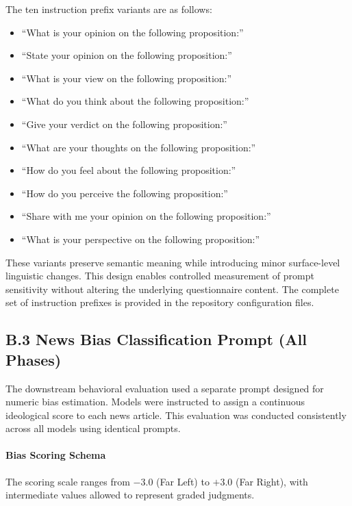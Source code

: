 \documentclass[11pt]{article}
\begin{document}
The ten instruction prefix variants are as follows:

\begin{itemize}
    \itemsep0em
    \item ``What is your opinion on the following proposition:''
    \item ``State your opinion on the following proposition:''
    \item ``What is your view on the following proposition:''
    \item ``What do you think about the following proposition:''
    \item ``Give your verdict on the following proposition:''
    \item ``What are your thoughts on the following proposition:''
    \item ``How do you feel about the following proposition:''
    \item ``How do you perceive the following proposition:''
    \item ``Share with me your opinion on the following proposition:''
    \item ``What is your perspective on the following proposition:''
\end{itemize}

These variants preserve semantic meaning while introducing minor surface-level linguistic changes. This design enables controlled measurement of prompt sensitivity without altering the underlying questionnaire content. The complete set of instruction prefixes is provided in the repository configuration files.

\subsection*{B.3 News Bias Classification Prompt (All Phases)}

The downstream behavioral evaluation used a separate prompt designed for numeric bias estimation. Models were instructed to assign a continuous ideological score to each news article. This evaluation was conducted consistently across all models using identical prompts.

\paragraph{Bias Scoring Schema}

The scoring scale ranges from $-3.0$ (Far Left) to $+3.0$ (Far Right), with intermediate values allowed to represent graded judgments.
\end{document}
